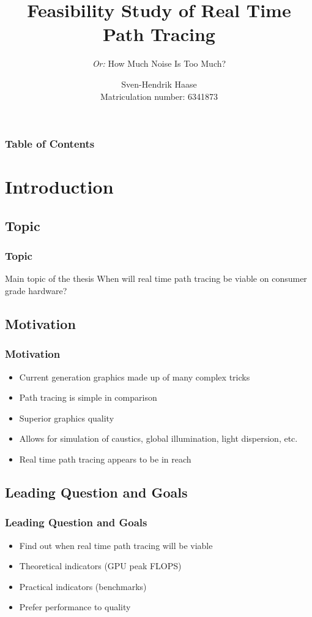 \documentclass{beamer}
\title[Path Tracing]
{Feasibility Study of Real Time Path Tracing}
\subtitle{\textit{Or:} How Much Noise Is Too Much?}
\author[Haase]{Sven-Hendrik Haase \\ \footnotesize Matriculation number: 6341873}
\institute[University of Hamburg]{
    Department of Computer Science\\
    University of Hamburg
}
\begin{document}
\frame{\titlepage}
\begin{frame}
    \frametitle{Table of Contents}
    \footnotesize
    \tableofcontents
\end{frame}

\section{Introduction}

\subsection{Topic}
\begin{frame}
    \frametitle{Topic}
    \begin{block}{Main topic of the thesis}
        When will real time path tracing be viable on consumer grade hardware?
    \end{block}
\end{frame}

\subsection{Motivation}
\begin{frame}
    \frametitle{Motivation}
    \begin{itemize}
        \item Current generation graphics made up of many complex tricks
        \pause
        \item Path tracing is simple in comparison
        \pause
        \item Superior graphics quality
        \pause
        \item Allows for simulation of caustics, global illumination, light dispersion, etc.
        \pause
        \item Real time path tracing appears to be in reach
    \end{itemize}
\end{frame}

\subsection{Leading Question and Goals}
\begin{frame}
    \frametitle{Leading Question and Goals}
    \begin{itemize}
        \item Find out when real time path tracing will be viable
        \item Theoretical indicators (GPU peak FLOPS)
        \item Practical indicators (benchmarks)
        \item Prefer performance to quality
    \end{itemize}
\end{frame}
\end{document}
